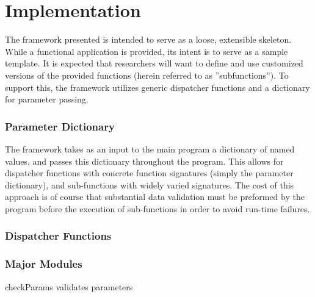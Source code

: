 \chapter{Implementation}
The framework presented is intended to serve as a loose, extensible skeleton.  While a functional application is provided, its intent is to serve as a sample template.  It is expected that researchers will want to define and use customized versions of the provided functions (herein referred to as ''subfunctions'').  To support this, the framework utilizes generic dispatcher functions and a dictionary for parameter passing.  

\subsection{Parameter Dictionary}
The framework takes as an input to the main program a dictionary of named values, and passes this dictionary throughout the program.  This allows for dispatcher functions with concrete function signatures (simply the parameter dictionary), and sub-functions with widely varied signatures.  The cost of this approach is of course that substantial data validation must be preformed by the program before the execution of sub-functions in order to avoid run-time failures.  

\subsection{Dispatcher Functions}


\subsection{Major Modules}
checkParams
validates parameters

